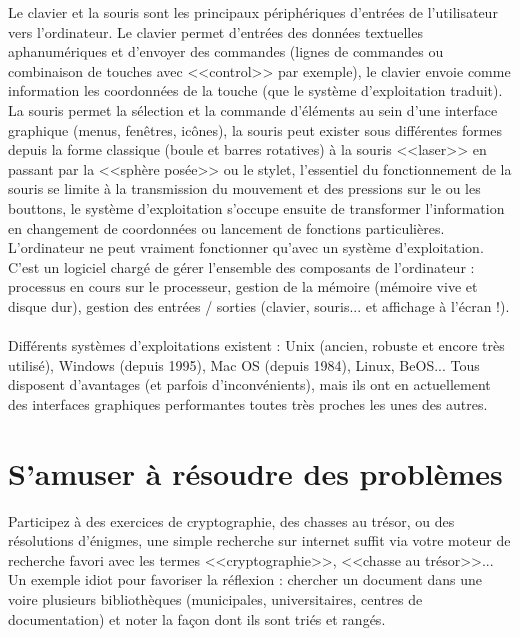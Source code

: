 \documentclass[11pt,twoside,a4paper]{article}
\begin{document}
		Le clavier et la souris sont les principaux p{\'e}riph{\'e}riques d'entr{\'e}es de l'utilisateur vers l'ordinateur. Le clavier permet d'entr{\'e}es des donn{\'e}es textuelles aphanum{\'e}riques et d'envoyer des commandes (lignes de commandes ou combinaison de touches avec <<control>> par exemple), le clavier envoie comme information les coordonn{\'e}es de la touche (que le syst{\`e}me d'exploitation traduit). La souris permet la s{\'e}lection et la commande d'{\'e}l{\'e}ments au sein d'une interface graphique (menus, fen{\^e}tres, ic{\^o}nes), la souris peut exister sous diff{\'e}rentes formes depuis la forme classique (boule et barres rotatives) {\`a} la souris <<laser>> en passant par la <<sph{\`e}re pos{\'e}e>> ou le stylet, l'essentiel du fonctionnement de la souris se limite {\`a} la transmission du mouvement et des pressions sur le ou les bouttons, le syst{\`e}me d'exploitation s'occupe ensuite de transformer l'information en changement de coordonn{\'e}es ou lancement de fonctions particuli{\`e}res. ~\\

	L'ordinateur ne peut vraiment fonctionner qu'avec un syst{\`e}me d'exploitation. C'est un logiciel charg{\'e} de g{\'e}rer l'ensemble des composants de l'ordinateur : processus en cours sur le processeur, gestion de la m{\'e}moire (m{\'e}moire vive et disque dur), gestion des entr{\'e}es / sorties (clavier, souris... et affichage {\`a} l'{\'e}cran !). ~\\

	Diff{\'e}rents syst{\`e}mes d'exploitations existent : Unix (ancien, robuste et encore tr{\`e}s utilis{\'e}), Windows (depuis 1995), Mac OS (depuis 1984), Linux, BeOS... Tous disposent d'avantages (et parfois d'inconv{\'e}nients), mais ils ont en actuellement des interfaces graphiques performantes toutes tr{\`e}s proches les unes des autres. 

\section{S'amuser {\`a} r{\'e}soudre des probl{\`e}mes}
		Participez {\`a} des exercices de cryptographie, des chasses au tr{\'e}sor, ou des r{\'e}solutions d'{\'e}nigmes, une simple recherche sur internet suffit via votre moteur de recherche favori avec les termes <<cryptographie>>, <<chasse au tr{\'e}sor>>... Un exemple idiot pour favoriser la r{\'e}flexion : chercher un document dans une voire plusieurs biblioth{\`e}ques (municipales, universitaires, centres de documentation) et noter la fa\c{c}on dont ils sont tri{\'e}s et rang{\'e}s. ~\\
\end{document}
